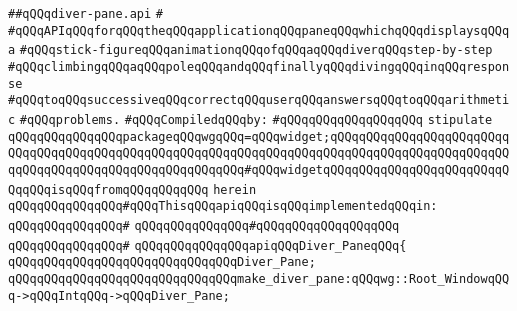 \label{src/lib/x-kit/tut/arithmetic-game/diver-pane.api}
\verb|##qQQqdiver-pane.api|\newline
\verb|#|\newline
\verb|#qQQqAPIqQQqforqQQqtheqQQqapplicationqQQqpaneqQQqwhichqQQqdisplaysqQQqa|\newline
\verb|#qQQqstick-figureqQQqanimationqQQqofqQQqaqQQqdiverqQQqstep-by-step|\newline
\verb|#qQQqclimbingqQQqaqQQqpoleqQQqandqQQqfinallyqQQqdivingqQQqinqQQqresponse|\newline
\verb|#qQQqtoqQQqsuccessiveqQQqcorrectqQQquserqQQqanswersqQQqtoqQQqarithmetic|\newline
\verb|#qQQqproblems.|\newline
\newline
\verb|#qQQqCompiledqQQqby:|\newline
\verb|#qQQqqQQqqQQqqQQqqQQq|\newline
\newline
\newline
\verb|stipulate|\newline
\verb|qQQqqQQqqQQqqQQqpackageqQQqwgqQQq=qQQqwidget;qQQqqQQqqQQqqQQqqQQqqQQqqQQqqQQqqQQqqQQqqQQqqQQqqQQqqQQqqQQqqQQqqQQqqQQqqQQqqQQqqQQqqQQqqQQqqQQqqQQqqQQqqQQqqQQqqQQqqQQqqQQqqQQq#qQQqwidgetqQQqqQQqqQQqqQQqqQQqqQQqqQQqqQQqisqQQqfromqQQqqQQqqQQq|\newline
\verb|herein|\newline
\newline
\verb|qQQqqQQqqQQqqQQq#qQQqThisqQQqapiqQQqisqQQqimplementedqQQqin:|\newline
\verb|qQQqqQQqqQQqqQQq#|\newline
\verb|qQQqqQQqqQQqqQQq#qQQqqQQqqQQqqQQqqQQq|\newline
\verb|qQQqqQQqqQQqqQQq#|\newline
\verb|qQQqqQQqqQQqqQQqapiqQQqDiver_PaneqQQq{|\newline
\newline
\verb|qQQqqQQqqQQqqQQqqQQqqQQqqQQqqQQqDiver_Pane;|\newline
\newline
\verb|qQQqqQQqqQQqqQQqqQQqqQQqqQQqqQQqmake_diver_pane:qQQqwg::Root_WindowqQQq->qQQqIntqQQq->qQQqDiver_Pane;|\newline
